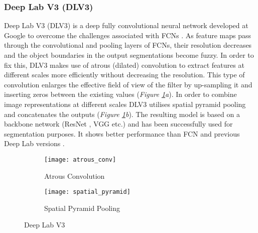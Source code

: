 \documentclass[main.tex]{subfiles}
\begin{document}
\subsubsection{Deep Lab V3 (DLV3)}
Deep Lab V3 (DLV3) is a deep fully convolutional neural network developed at Google to overcome the challenges associated with FCNs \cite{Chen2017}. As feature maps pass through the convolutional and pooling layers of FCNs, their resolution decreases and the object boundaries in the output segmentations become fuzzy. In order to fix this, DLV3 makes use of atrous (dilated) convolution to extract features at different scales more efficiently without decreasing the resolution. This type of convolution enlarges the effective field of view of the filter by up-sampling it and inserting zeros between the existing values (\emph{Figure \ref{fig:atrous}a}). In order to combine image representations at different scales DLV3 utilises spatial pyramid pooling and concatenates the outputs (\emph{Figure \ref{fig:atrous}b}). The resulting model is based on a backbone network (ResNet \cite{He2016}, VGG \cite{Simonyan2015} etc.) and has been successfully used for segmentation purposes. It shows better performance than FCN and previous Deep Lab versions \cite{Chen2017}.
\begin{figure}[h]
\centering
\begin{subfigure}[c]{0.5\textwidth}
\centering
\texttt{[image: atrous\_conv]}
\caption{Atrous Convolution}
\end{subfigure}%
\hspace*{2cm}%
\begin{subfigure}[c]{0.32\textwidth}
\centering
\texttt{[image: spatial\_pyramid]}
\caption{Spatial Pyramid Pooling}
\end{subfigure}%
\caption{Deep Lab V3 \cite{Chen2017}}
\label{fig:atrous}
\end{figure}
\end{document}

